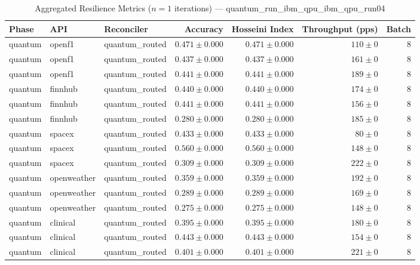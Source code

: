 
\begin{table}[htbp]
\caption{Aggregated Resilience Metrics ($n=1$ iterations) --- quantum_run_ibm_qpu_ibm_qpu_run04}
\begin{tabular}{l l l r r r r}
\hline
Phase & API & Reconciler & Accuracy & Hosseini Index & Throughput (pps) & Batch \\
\hline
quantum & openf1 & quantum\_routed & $0.471\pm0.000$ & $0.471\pm0.000$ & $110\pm0$ & 8 \\
quantum & openf1 & quantum\_routed & $0.437\pm0.000$ & $0.437\pm0.000$ & $161\pm0$ & 8 \\
quantum & openf1 & quantum\_routed & $0.441\pm0.000$ & $0.441\pm0.000$ & $189\pm0$ & 8 \\
quantum & finnhub & quantum\_routed & $0.440\pm0.000$ & $0.440\pm0.000$ & $174\pm0$ & 8 \\
quantum & finnhub & quantum\_routed & $0.441\pm0.000$ & $0.441\pm0.000$ & $156\pm0$ & 8 \\
quantum & finnhub & quantum\_routed & $0.280\pm0.000$ & $0.280\pm0.000$ & $185\pm0$ & 8 \\
quantum & spacex & quantum\_routed & $0.433\pm0.000$ & $0.433\pm0.000$ & $80\pm0$ & 8 \\
quantum & spacex & quantum\_routed & $0.560\pm0.000$ & $0.560\pm0.000$ & $148\pm0$ & 8 \\
quantum & spacex & quantum\_routed & $0.309\pm0.000$ & $0.309\pm0.000$ & $222\pm0$ & 8 \\
quantum & openweather & quantum\_routed & $0.359\pm0.000$ & $0.359\pm0.000$ & $192\pm0$ & 8 \\
quantum & openweather & quantum\_routed & $0.289\pm0.000$ & $0.289\pm0.000$ & $169\pm0$ & 8 \\
quantum & openweather & quantum\_routed & $0.275\pm0.000$ & $0.275\pm0.000$ & $148\pm0$ & 8 \\
quantum & clinical & quantum\_routed & $0.395\pm0.000$ & $0.395\pm0.000$ & $180\pm0$ & 8 \\
quantum & clinical & quantum\_routed & $0.443\pm0.000$ & $0.443\pm0.000$ & $154\pm0$ & 8 \\
quantum & clinical & quantum\_routed & $0.401\pm0.000$ & $0.401\pm0.000$ & $221\pm0$ & 8 \\

\end{tabular}
\end{table}
